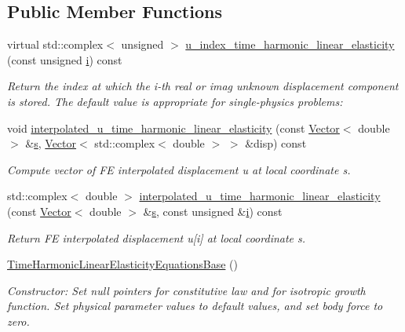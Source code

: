 \subsection*{Public Member Functions}
\begin{DoxyCompactItemize}
\item 
virtual std\+::complex$<$ unsigned $>$ \hyperlink{classoomph_1_1TimeHarmonicLinearElasticityEquationsBase_a847401d5305a393e7c133cd92bd0bb35}{u\+\_\+index\+\_\+time\+\_\+harmonic\+\_\+linear\+\_\+elasticity} (const unsigned \hyperlink{cfortran_8h_adb50e893b86b3e55e751a42eab3cba82}{i}) const
\begin{DoxyCompactList}\small\item\em Return the index at which the i-\/th real or imag unknown displacement component is stored. The default value is appropriate for single-\/physics problems\+: \end{DoxyCompactList}\item 
void \hyperlink{classoomph_1_1TimeHarmonicLinearElasticityEquationsBase_a3687a170e0ca6065a410710dd5bc71b3}{interpolated\+\_\+u\+\_\+time\+\_\+harmonic\+\_\+linear\+\_\+elasticity} (const \hyperlink{classoomph_1_1Vector}{Vector}$<$ double $>$ \&\hyperlink{cfortran_8h_ab7123126e4885ef647dd9c6e3807a21c}{s}, \hyperlink{classoomph_1_1Vector}{Vector}$<$ std\+::complex$<$ double $>$ $>$ \&disp) const
\begin{DoxyCompactList}\small\item\em Compute vector of FE interpolated displacement u at local coordinate s. \end{DoxyCompactList}\item 
std\+::complex$<$ double $>$ \hyperlink{classoomph_1_1TimeHarmonicLinearElasticityEquationsBase_ab2d96120b64ae6c92a115a64fe421241}{interpolated\+\_\+u\+\_\+time\+\_\+harmonic\+\_\+linear\+\_\+elasticity} (const \hyperlink{classoomph_1_1Vector}{Vector}$<$ double $>$ \&\hyperlink{cfortran_8h_ab7123126e4885ef647dd9c6e3807a21c}{s}, const unsigned \&\hyperlink{cfortran_8h_adb50e893b86b3e55e751a42eab3cba82}{i}) const
\begin{DoxyCompactList}\small\item\em Return FE interpolated displacement u\mbox{[}i\mbox{]} at local coordinate s. \end{DoxyCompactList}\item 
\hyperlink{classoomph_1_1TimeHarmonicLinearElasticityEquationsBase_a993b2b5b1542dbb8f2c1cd2202c764d4}{Time\+Harmonic\+Linear\+Elasticity\+Equations\+Base} ()
\begin{DoxyCompactList}\small\item\em Constructor\+: Set null pointers for constitutive law and for isotropic growth function. Set physical parameter values to default values, and set body force to zero. \end{DoxyCompactList}\item 

\end{DoxyCompactItemize}

